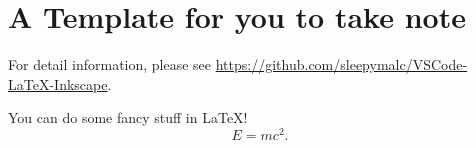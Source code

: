 \section{A Template for you to take note}
For detail information, please see \url{https://github.com/sleepymalc/VSCode-LaTeX-Inkscape}.

You can do some fancy stuff in \LaTeX!
\[
	E = mc^2.
\]